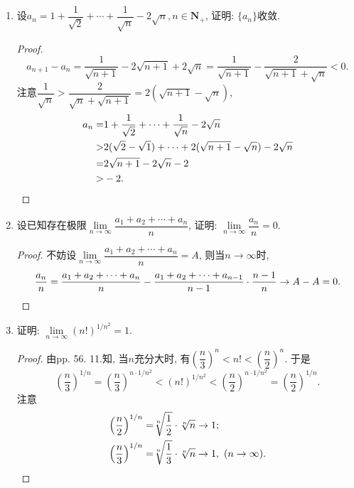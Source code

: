 \documentclass[a4paper,11pt,twoside]{ctexbook}
\begin{document}
\begin{enumerate}
	\item 设$a_n=1+\dfrac{1}{\sqrt{2}}+\cdots+\dfrac{1}{\sqrt{n}}-2\sqrt{n}, n\in\mathbf{N}_{+}$, 证明: $\{a_n\}$收敛.
	      \begin{proof}
		      \[
			      a_{n+1}-a_n=\dfrac{1}{\sqrt{n+1}}-2\sqrt{n+1}+2\sqrt{n}=\dfrac{1}{\sqrt{n+1}}-\dfrac{2}{\sqrt{n+1}+\sqrt{n}}<0.
		      \]
		      注意$\dfrac{1}{\sqrt{n}}>\dfrac{2}{\sqrt{n}+\sqrt{n+1}}=2(\sqrt{n+1}-\sqrt{n})$,
		      \[
			      \begin{split}
				      a_n=&1+\dfrac{1}{\sqrt{2}}+\cdots+\dfrac{1}{\sqrt{n}}-2\sqrt{n}\\
				      >&2(\sqrt{2}-\sqrt{1})+\cdots+2(\sqrt{n+1}-\sqrt{n})-2\sqrt{n}\\
				      =&2\sqrt{n+1}-2\sqrt{n}-2\\
				      >&-2. \qedhere
			      \end{split}
		      \]
	      \end{proof}
	\item 设已知存在极限$\lim\limits_{n\to\infty} \dfrac{a_1+a_2+\cdots+a_n}{n}$, 证明: $\lim\limits_{n\to\infty} \dfrac{a_n}{n}=0$.
	      \begin{proof}
		      不妨设$\lim\limits_{n\to\infty} \dfrac{a_1+a_2+\cdots+a_n}{n}=A$, 则当$n\to\infty$时,
		      \[
			      \dfrac{a_n}{n}=\dfrac{a_1+a_2+\cdots+a_n}{n}-\dfrac{a_1+a_2+\cdots+a_{n-1}}{n-1}\cdot\dfrac{n-1}{n}\to A-A=0. \qedhere
		      \]
	      \end{proof}

	\item 证明: $\lim\limits_{n\to\infty} (n!)^{1/n^2}=1$.
	      \begin{proof}
		      由pp. 56. 11.知, 当$n$充分大时, 有$\left(\dfrac{n}{3}\right)^n<n!<\left(\dfrac{n}{2}\right)^n$. 于是
		      \[
			      \left(\dfrac{n}{3}\right)^{1/n}=\left(\dfrac{n}{3}\right)^{n\cdot 1/n^2}<(n!)^{1/n^2}<\left(\dfrac{n}{2}\right)^{n\cdot 1/n^2}=\left(\dfrac{n}{2}\right)^{1/n}.
		      \]
		      注意
		      \[
			      \begin{split}
				      \left(\dfrac{n}{2}\right)^{1/n}=&\sqrt[n]{\dfrac{1}{2}}\cdot\sqrt[n]{n}\to 1;\\
				      \left(\dfrac{n}{3}\right)^{1/n}=&\sqrt[n]{\dfrac{1}{3}}\cdot\sqrt[n]{n}\to 1, \ (n\to\infty). \qedhere
			      \end{split}
		      \]
	      \end{proof}


\end{enumerate}
\end{document}
